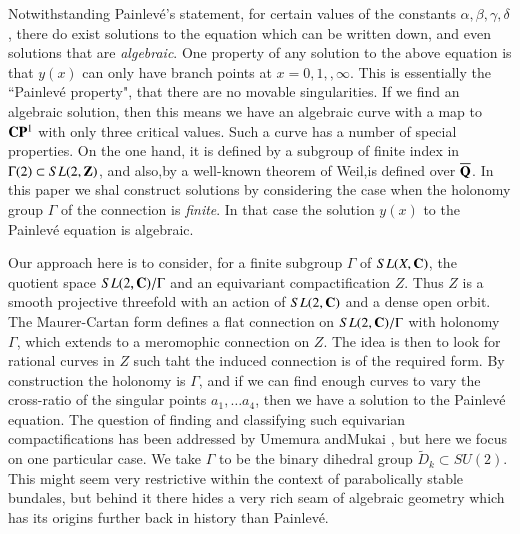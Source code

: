Notwithstanding Painlev\'e's statement, for certain values of the constants $\alpha, \beta, \gamma, \delta$, there do exist solutions to the equation which can be written down, and even solutions that are \textit{algebraic}. One property of any solution to the above equation is that $y(x)$ can only have branch points at $x = 0,1,, \infty$. This is essentially the ``Painlev\'e property", that there are no movable singularities. If we find an algebraic solution, then this means we have an algebraic curve with a map to $\mathbf{C}\mathbf{P}^{1}$ with only three critical values. Such a curve has a number of special properties. On the one hand, it is defined by a subgroup of finite index in $\Gamma(2) \subset SL(2, \mathbf{Z})$, and also,by a well-known theorem of Weil,is defined over $\overline{\mathbf{Q}}$. In this paper we shal construct solutions by considering the case when the holonomy group $\Gamma$ of the connection is \textit{finite}. In that case the solution $y(x)$ to the Painlev\'e equation is algebraic.

\newpage

Our approach here is to consider, for a finite subgroup $\Gamma$ of $SL(X, \mathbf{C})$, the quotient space $SL(2 ,\mathbf{C})/\Gamma$ and an equivariant compactification $Z$. Thus $Z$ is a smooth projective threefold with an action of $SL(2, \mathbf{C})$ and a dense open orbit. The Maurer-Cartan form defines a flat connection on $SL(2, \mathbf{C})/\Gamma$ with holonomy $\Gamma$, which extends to a meromophic connection on $Z$. The idea is then to look for rational curves in $Z$ such taht the induced connection is of the required form. By construction the holonomy is $\Gamma$, and if we can find enough curves to vary the cross-ratio of the singular points $a_{1}, \ldots a_{4}$, then we have a solution to the Painlev\'e equation. The question of finding and classifying such equivarian compactifications has been addressed by Umemura and\pageoriginale Mukai \cite{art7-key12}, but here we focus on one particular case. We take $\Gamma$ to be the binary dihedral group $\tilde{D}_{k} \subset SU(2)$. This might seem very restrictive within the context of parabolically stable bundales, but behind it there hides a very rich seam of algebraic geometry which has its origins further back in history than Painlev\'e.

